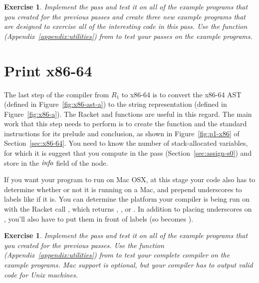 \documentclass[11pt]{book}
\newtheorem{exercise}[theorem]{Exercise}
\begin{document}
\begin{exercise}
\normalfont
Implement the  pass and test it on all of the
example programs that you created for the previous passes and create
three new example programs that are designed to exercise all of the
interesting code in this pass. Use the  function
(Appendix~\ref{appendix:utilities}) from  to test
your passes on the example programs.
\end{exercise}


\section{Print x86-64}
\label{sec:print-x86}
The last step of the compiler from $R_1$ to x86-64 is to convert the
x86-64 AST (defined in Figure~\ref{fig:x86-ast-a}) to the string
representation (defined in Figure~\ref{fig:x86-a}). The Racket
 and  functions are useful in this
regard. The main work that this step needs to perform is to create the
 function and the standard instructions for its prelude
and conclusion, as shown in Figure~\ref{fig:p1-x86} of
Section~\ref{sec:x86-64}. You need to know the number of
stack-allocated variables, for which it is suggest that you compute in
the  pass (Section~\ref{sec:assign-s0}) and store in
the $\mathit{info}$ field of the  node.

If you want your program to run on Mac OSX, at this stage your code also has to determine whether or not it is running on a Mac, and prepend underscores to labels like  if it is. 
You can determine the platform your compiler is being run on with the Racket 
call , which returns , , or .
In addition to placing underscores on , you'll also have to put them in front of 
 labels (so  becomes ).

\begin{exercise}
\normalfont Implement the  pass and test it on all of
the example programs that you created for the previous passes. Use the
 function (Appendix~\ref{appendix:utilities}) from
 to test your complete compiler on the example
programs. Mac support is optional, but your compiler has to output valid code for Unix machines.
\end{exercise}
\end{document}
